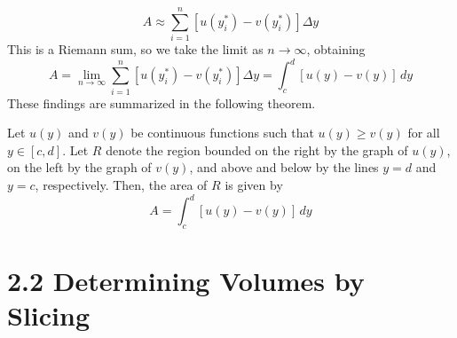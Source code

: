 \documentclass{report}
\begin{document}
    \[
    A \approx \sum_{i=1}^{n} [u(y^*_i) - v(y^*_i)] \Delta y
    \]
    This is a Riemann sum, so we take the limit as \( n \to \infty \), obtaining
    \[
    A = \lim_{{n \to \infty}} \sum_{i=1}^{n} [u(y^*_i) - v(y^*_i)] \Delta y = \int_{c}^{d} [u(y) - v(y)] \, dy
    \]
    These findings are summarized in the following theorem.
    \bigbreak \noindent 
    \begin{thrm}
       Let \( u(y) \) and \( v(y) \) be continuous functions such that \( u(y) \geq v(y) \) for all \( y \in [c, d] \). Let \( R \) denote the region bounded on the right by the graph of \( u(y) \), on the left by the graph of \( v(y) \), and above and below by the lines \( y = d \) and \( y = c \), respectively. Then, the area of \( R \) is given by
        \[
        A = \int_{c}^{d} [u(y) - v(y)] \, dy
        \] 
    \end{thrm}

    \pagebreak 
    \section*{2.2 Determining Volumes by Slicing}
    \bigbreak \noindent 
\end{document}
